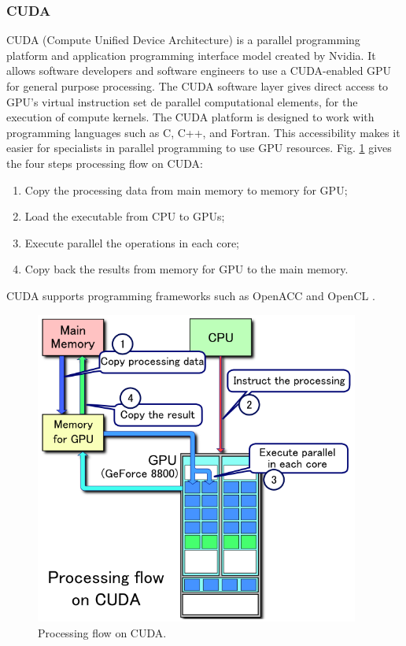 \subsubsection{CUDA}

CUDA (Compute Unified Device Architecture) \cite{nvidia2011nvidia} is a parallel programming platform and application programming interface model created by Nvidia. It allows software developers and software engineers to use a CUDA-enabled GPU for general purpose processing. The CUDA software layer gives direct access to GPU's virtual instruction set de parallel computational elements, for the execution of compute kernels. The CUDA platform is designed to work with programming languages such as C, C++, and Fortran. This accessibility makes it easier for specialists in parallel programming to use GPU resources. Fig. \ref{cuda_flow} gives the four steps processing flow on CUDA:

\begin{enumerate}
	\item Copy the processing data from main memory to memory for GPU;
	\item Load the executable from CPU to GPUs;
	\item Execute parallel the operations in each core;
	\item Copy back the results from memory for GPU to the main memory.
\end{enumerate}

CUDA supports programming frameworks such as OpenACC \cite{wienke2012openacc} and OpenCL \cite{munshi2009opencl}. 

\begin{figure}[htbp]
	\centering
	\includegraphics[width=4.2in]{fig/CUDA.png}
	\caption{Processing flow on CUDA.}
	\label{cuda_flow}
\end{figure}

